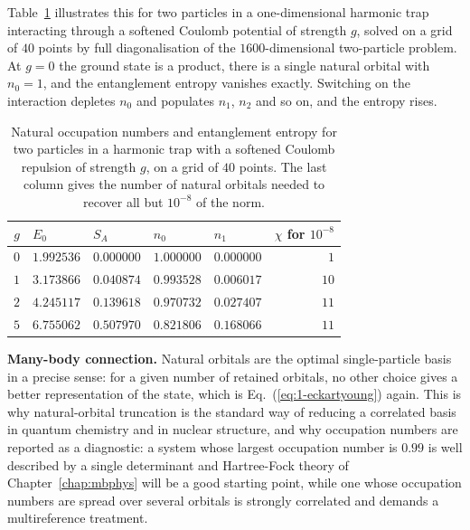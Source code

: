 Table~\ref{tab:natural} illustrates this for two particles in a
one-dimensional harmonic trap interacting through a softened Coulomb
potential of strength $g$, solved on a grid of $40$ points by full
diagonalisation of the $1600$-dimensional two-particle problem.  At $g=0$ the
ground state is a product, there is a single natural orbital with $n_0=1$, and
the entanglement entropy vanishes exactly.  Switching on the interaction
depletes $n_0$ and populates $n_1$, $n_2$ and so on, and the entropy rises.

\begin{table}[h]
\centering
\renewcommand{\arraystretch}{1.25}
\setlength{\tabcolsep}{9pt}
\begin{tabular}{rllllr}
\toprule
$g$ & $E_0$ & $S_A$ & $n_0$ & $n_1$ & $\chi$ for $10^{-8}$\\
\midrule
$0$ & $1.992536$ & $0.000000$ & $1.000000$ & $0.000000$ & $1$\\
$1$ & $3.173866$ & $0.040874$ & $0.993528$ & $0.006017$ & $10$\\
$2$ & $4.245117$ & $0.139618$ & $0.970732$ & $0.027407$ & $11$\\
$5$ & $6.755062$ & $0.507970$ & $0.821806$ & $0.168066$ & $11$\\
\bottomrule
\end{tabular}
\caption{Natural occupation numbers and entanglement entropy for two
particles in a harmonic trap with a softened Coulomb repulsion of strength
$g$, on a grid of $40$ points.  The last column gives the number of natural
orbitals needed to recover all but $10^{-8}$ of the norm.}
\label{tab:natural}
\end{table}

\begin{notebox}
\textbf{Many-body connection.} Natural orbitals are the optimal
single-particle basis in a precise sense: for a given number of retained
orbitals, no other choice gives a better representation of the state, which
is Eq.~(\ref{eq:1-eckartyoung}) again.  This is why natural-orbital
truncation is the standard way of reducing a correlated basis in quantum
chemistry and in nuclear structure, and why occupation numbers are reported
as a diagnostic: a system whose largest occupation number is $0.99$ is
well described by a single determinant and Hartree-Fock theory of
Chapter~\ref{chap:mbphys} will be a good starting point, while one whose
occupation numbers are spread over several orbitals is strongly correlated
and demands a multireference treatment.
\end{notebox}

